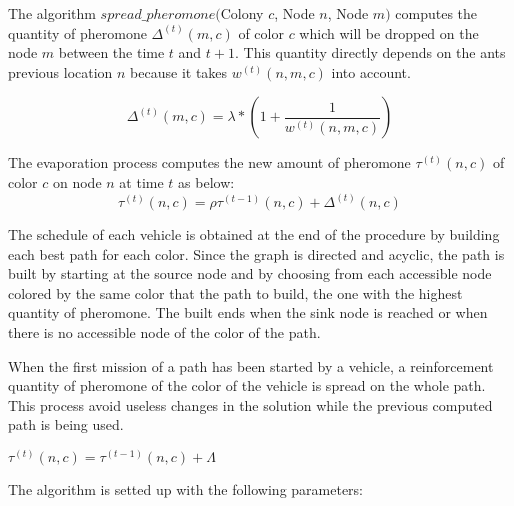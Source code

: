 \documentclass[a4paper,10pt]{article}
\begin{document}
The algorithm $spread\_pheromone($Colony $c$, Node $n$, Node $m)$ computes the quantity of pheromone $\Delta^{(t)}(m,c)$ of color $c$  which will be dropped on the node $m$ between the time $t$ and $t+1$. This quantity directly depends on the ants previous location $n$ because it takes $w^{(t)}(n,m,c)$ into account.

\begin{equation*}
 \Delta^{(t)}(m,c) = \lambda * \left(1 + \frac{1}{w^{(t)}(n,m,c)} \right)
\end{equation*}

The evaporation process computes the new amount of pheromone $\tau^{(t)}(n,c)$ of color $c$ on node $n$ at time $t$ as below:
\begin{equation*}
 \tau^{(t)}(n,c) = \rho \tau^{(t-1)}(n,c) + \Delta^{(t)}(n,c)
\end{equation*}

The schedule of each vehicle is obtained at the end of the procedure by building each best path for each color. Since the graph is directed and acyclic, the path is built by starting at the source node and by choosing from each accessible node colored by the same color that the path to build, the one with the highest quantity of pheromone. The built ends when the sink node is reached or when there is no accessible node of the color of the path.


When the first mission of a path has been started by a vehicle, a reinforcement quantity of pheromone of the color of the vehicle is spread on the whole path. This process avoid useless changes in the solution while the previous computed path is being used.


\begin{algorithm}
\label{algoReinforcement}
\begin{algorithmic} 
\STATE $\tau^{(t)}(n,c) =  \tau^{(t-1)}(n,c) + \Lambda$
\ENDFOR
\end{algorithmic}
\end{algorithm}

The algorithm is setted up with the following parameters:
\end{document}
